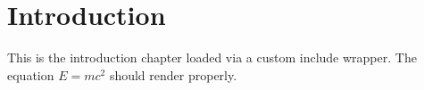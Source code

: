 \section{Introduction}
This is the introduction chapter loaded via a custom include wrapper.
The equation $E = mc^2$ should render properly.
